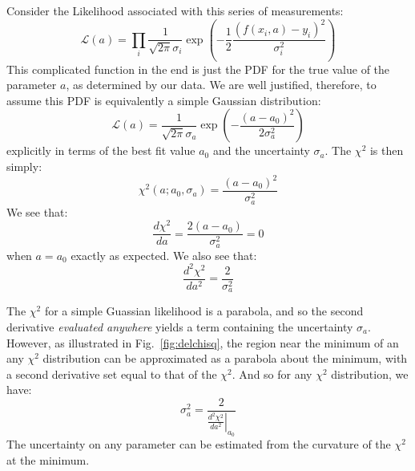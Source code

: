 \documentclass[12pt,oneside]{book}
\begin{document}
Consider the Likelihood associated with this series of measurements:
\begin{displaymath}
\mathcal{L}(a) = \prod_i \frac{1}{\sqrt{2\pi} \sigma_i} \exp\left(-\frac{1}{2} \frac{(f(x_i,a)-y_i)^2}{\sigma_i^2}\right)
\end{displaymath}
This complicated function in the end is just the PDF for the true value of the parameter $a$, as determined by our data.  We are well justified, therefore, to assume this PDF is equivalently a simple Gaussian distribution: 
\begin{displaymath}
\mathcal{L}(a) =  \frac{1}{\sqrt{2\pi} \sigma_a} \exp\left(-\frac{(a-a_0)^2}{2\sigma_a^2}\right)
\end{displaymath}
explicitly in terms of the best fit value $a_0$ and the uncertainty $\sigma_a$.  The $\chi^2$ is then simply:
\begin{equation} \label{eqn:chisqa}
\chi^2(a; a_0, \sigma_a) = \frac{(a-a_0)^2}{\sigma_a^2}
\end{equation}
We see that:
\begin{displaymath}
\frac{d\chi^2}{da} = \frac{2 (a-a_0)}{\sigma_a^2} = 0
\end{displaymath}
when $a=a_0$ exactly as expected.  We also see that:
\begin{displaymath}
\frac{d^2\chi^2}{da^2} = \frac{2}{\sigma_a^2}
\end{displaymath}

The $\chi^2$ for a simple Guassian likelihood is a parabola, and so
the second derivative {\em evaluated anywhere} yields a term
containing the uncertainty $\sigma_a$.  However, as illustrated in
Fig.~\ref{fig:delchisq}, the region near the minimum of an any
$\chi^2$ distribution can be approximated as a parabola about the
minimum, with a second derivative set equal to that of the $\chi^2$.
And so for any $\chi^2$ distribution, we have:
\begin{equation} \label{eqn:chisqunc}
\sigma_a^2  = \frac{2}{\left. \frac{d^2\chi^2}{da^2} \right|_{a_0}}
\end{equation}
The uncertainty on any parameter can be estimated from the curvature of the $\chi^2$ at the minimum.
\end{document}
